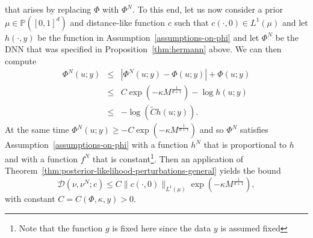 \documentclass[final]{siamart171218}
\newcommand{\mbb}{\mathbb}
\newcommand{\R}{\mbb{R}}
\newcommand{\PP}{\mbb{P}}
\newcommand{\cc}{c}
\newcommand{\K}{\mathcal{D}}
\newcommand{\N}{\mathsf{N}}
\begin{document}
that arises by replacing $\Phi$ with $\Phi^N$.
To this end, let us now consider a prior $\mu \in \PP([0,1]^d)$ and distance-like function $c$ 
such that $c(\cdot, 0) \in L^1(\mu)$ and let $h(\cdot, y)$ be the function in Assumption~\ref{assumptions-on-phi} and let $\Phi^N$ be the DNN that was specified in 
Proposition~\ref{thm:hermann} above. 
We can then compute
\begin{eqnarray*}
	\Phi^N(u; y) & \leq & |\Phi^N(u;y) - \Phi(u;y)| + \Phi(u;y) \\
  & \leq & C \exp(-\kappa M^{\frac 1{d+1}}) - \log h(u;y) \\
	& \leq  & - \log \left(\widetilde{C} h(u;y)\right).
\end{eqnarray*}
At the same time $\Phi^N(u;y) \geq - C\exp(-\kappa M^{\frac 1{d+1}})$ and so 
$\Phi^N$ satisfies Assumption~\ref{assumptions-on-phi} with a function $h^N$
that is proportional to $h$ and with a function $f^N$ that is constant\footnote{Note that the 
function $g$ is fixed here since the data $y$ is assumed fixed}. 
Then an application of Theorem~\ref{thm:posterior-likelihood-perturbations-general}
yields the bound 
\begin{equation*}
	\K(\nu, \nu^N; \cc) \le
    C \| c(\cdot, 0) \|_{L^1(\mu)}\exp\left(-\kappa M^{\frac 1{d+1}}\right),
\end{equation*}
with constant $C=C(\Phi,\kappa,y) > 0$.


\end{document}
